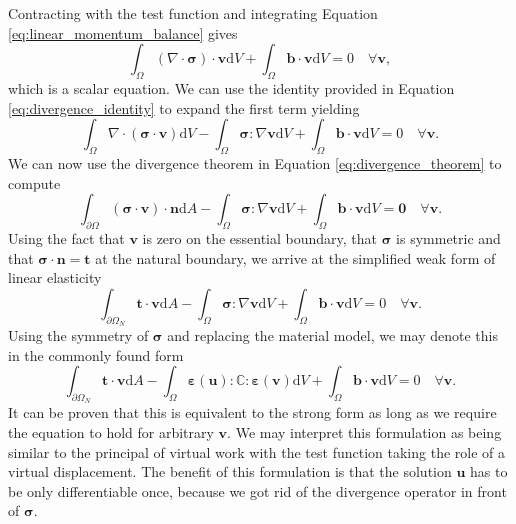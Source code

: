 Contracting with the test function and integrating Equation \eqref{eq:linear_momentum_balance} gives
\begin{equation}
    \int_\Omega (\nabla \cdot \pmb{\sigma}) \cdot \mathbf{v} \text{d}V
    + \int_\Omega \mathbf{b} \cdot \mathbf{v} \text{d}V = 0 \quad \forall \mathbf{v},
    \label{eq:weak_form_raw}
\end{equation}
which is a scalar equation. We can use the identity provided in Equation \eqref{eq:divergence_identity} to expand the first term yielding
\begin{equation}
    \int_\Omega \nabla \cdot (\pmb{\sigma} \cdot \mathbf{v}) \text{d}V
    - \int_\Omega \pmb{\sigma} : \nabla \mathbf{v} \text{d}V
    + \int_\Omega \mathbf{b} \cdot \mathbf{v} \text{d}V = 0 \quad \forall \mathbf{v}.
\end{equation}
We can now use the divergence theorem in Equation \eqref{eq:divergence_theorem} to compute 
\begin{equation}
    \int_{\partial \Omega} (\pmb{\sigma} \cdot \mathbf{v}) \cdot \mathbf{n} \text{d}A
    - \int_\Omega \pmb{\sigma} : \nabla \mathbf{v} \text{d}V
    + \int_\Omega \mathbf{b} \cdot \mathbf{v} \text{d}V = \mathbf{0} \quad \forall \mathbf{v}.
\end{equation}
Using the fact that $\mathbf{v}$ is zero on the essential boundary, that $\pmb{\sigma}$ is symmetric and that $\pmb{\sigma}\cdot \mathbf{n} = \mathbf{t}$ at the natural boundary, we arrive at the simplified weak form of linear elasticity 
\begin{equation}
    \int_{\partial \Omega_N} \mathbf{t} \cdot \mathbf{v} \text{d}A
    - \int_\Omega \pmb{\sigma} : \nabla \mathbf{v} \text{d}V
    + \int_\Omega \mathbf{b} \cdot \mathbf{v} \text{d}V = 0 \quad \forall \mathbf{v}.
\end{equation}
Using the symmetry of $\pmb{\sigma}$ and replacing the material model, we may denote this in the commonly found form
\begin{equation}
    \int_{\partial \Omega_N} \mathbf{t} \cdot \mathbf{v} \text{d}A
    - \int_\Omega \pmb{\varepsilon}(\mathbf{u}) : \mathbb{C} :  \pmb{\varepsilon}(\mathbf{v}) \text{d}V
    + \int_\Omega \mathbf{b} \cdot \mathbf{v} \text{d}V = 0 \quad \forall \mathbf{v}.
\end{equation}
It can be proven that this is equivalent to the strong form as long as we require the equation to hold for arbitrary $\mathbf{v}$. We may interpret this formulation as being similar to the principal of virtual work with the test function taking the role of a virtual displacement.
The benefit of this formulation is that the solution $\mathbf{u}$ has to be only differentiable once, because we got rid of the divergence operator in front of $\pmb{\sigma}$.


